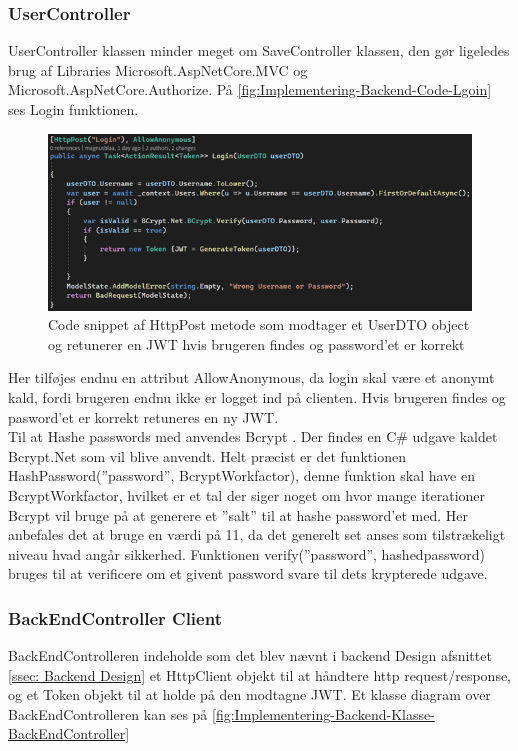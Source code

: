 \subsubsection{UserController}

UserController klassen minder meget om SaveController klassen, den gør ligeledes brug af Libraries Microsoft.AspNetCore.MVC og Microsoft.AspNetCore.Authorize. På \autoref{fig:Implementering-Backend-Code-Lgoin} ses Login funktionen.

\begin{figure}[H]
\centering
\includegraphics[width = \textwidth]{02-Body/Images/Backend_Code_Login.PNG}
\caption{Code snippet af HttpPost metode som modtager et UserDTO object og retunerer en JWT hvis brugeren findes og password’et er korrekt}
\label{fig:Implementering-Backend-Code-Lgoin}
\end{figure}

Her tilføjes endnu en attribut AllowAnonymous, da login skal være et anonymt kald, fordi brugeren endnu ikke er logget ind på clienten. Hvis brugeren findes og pasword'et er korrekt retuneres en ny JWT.\\

Til at Hashe passwords med anvendes Bcrypt \cite{Bcrypt}. Der findes en C\# udgave kaldet Bcrypt.Net  som vil blive anvendt. Helt præcist er det funktionen HashPassword(”password”, BcryptWorkfactor), denne funktion skal have en BcryptWorkfactor, hvilket er et tal der siger noget om hvor mange iterationer Bcrypt vil bruge på at generere et ”salt” til at hashe password’et med. Her anbefales det at bruge en værdi på 11, da det generelt set anses som tilstrækeligt niveau hvad angår sikkerhed.
Funktionen verify(”password”, hashedpassword) bruges til at verificere om et givent password svare til dets krypterede udgave.\\


\subsubsection{BackEndController Client}
BackEndControlleren indeholde som det blev nævnt i backend Design afsnittet \autoref{ssec: Backend Design} et HttpClient objekt til at håndtere http request/response, og et Token objekt til at holde på den modtagne JWT.
Et klasse diagram over BackEndControlleren kan ses på \autoref{fig:Implementering-Backend-Klasse-BackEndController}\\

